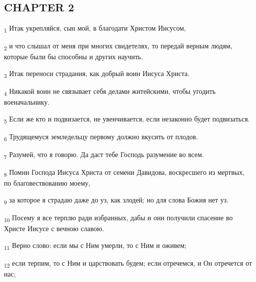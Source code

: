 \subsection{CHAPTER 2}
\begin{tcolorbox}
\textsubscript{1} Итак укрепляйся, сын мой, в благодати Христом Иисусом,
\end{tcolorbox}
\begin{tcolorbox}
\textsubscript{2} и что слышал от меня при многих свидетелях, то передай верным людям, которые были бы способны и других научить.
\end{tcolorbox}
\begin{tcolorbox}
\textsubscript{3} Итак переноси страдания, как добрый воин Иисуса Христа.
\end{tcolorbox}
\begin{tcolorbox}
\textsubscript{4} Никакой воин не связывает себя делами житейскими, чтобы угодить военачальнику.
\end{tcolorbox}
\begin{tcolorbox}
\textsubscript{5} Если же кто и подвизается, не увенчивается, если незаконно будет подвизаться.
\end{tcolorbox}
\begin{tcolorbox}
\textsubscript{6} Трудящемуся земледельцу первому должно вкусить от плодов.
\end{tcolorbox}
\begin{tcolorbox}
\textsubscript{7} Разумей, что я говорю. Да даст тебе Господь разумение во всем.
\end{tcolorbox}
\begin{tcolorbox}
\textsubscript{8} Помни Господа Иисуса Христа от семени Давидова, воскресшего из мертвых, по благовествованию моему,
\end{tcolorbox}
\begin{tcolorbox}
\textsubscript{9} за которое я страдаю даже до уз, как злодей; но для слова Божия нет уз.
\end{tcolorbox}
\begin{tcolorbox}
\textsubscript{10} Посему я все терплю ради избранных, дабы и они получили спасение во Христе Иисусе с вечною славою.
\end{tcolorbox}
\begin{tcolorbox}
\textsubscript{11} Верно слово: если мы с Ним умерли, то с Ним и оживем;
\end{tcolorbox}
\begin{tcolorbox}
\textsubscript{12} если терпим, то с Ним и царствовать будем; если отречемся, и Он отречется от нас;
\end{tcolorbox}
